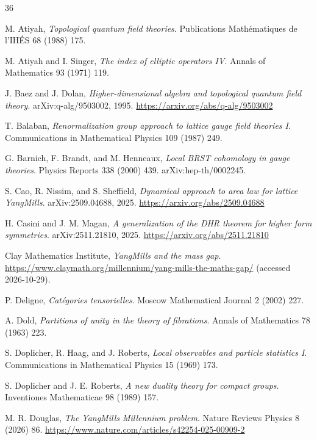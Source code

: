 \documentclass[11pt,letterpaper]{article}
\theoremstyle{definition}
\theoremstyle{remark}
\begin{document}
\begin{thebibliography}{36}

M. Atiyah, \emph{Topological quantum field theories}. Publications Math\'ematiques de l'IH\'ES 68 (1988) 175.

M. Atiyah and I. Singer, \emph{The index of elliptic operators IV}. Annals of Mathematics 93 (1971) 119.

J. Baez and J. Dolan, \emph{Higher-dimensional algebra and topological quantum field theory}. arXiv:q-alg/9503002, 1995. \url{https://arxiv.org/abs/q-alg/9503002}

T. Balaban, \emph{Renormalization group approach to lattice gauge field theories I}. Communications in Mathematical Physics 109 (1987) 249.

G. Barnich, F. Brandt, and M. Henneaux, \emph{Local BRST cohomology in gauge theories}. Physics Reports 338 (2000) 439. arXiv:hep-th/0002245.

S. Cao, R. Nissim, and S. Sheffield, \emph{Dynamical approach to area law for lattice Yang\textendash{}Mills}. arXiv:2509.04688, 2025. \url{https://arxiv.org/abs/2509.04688}

H. Casini and J. M. Magan, \emph{A generalization of the DHR theorem for higher form symmetries}. arXiv:2511.21810, 2025. \url{https://arxiv.org/abs/2511.21810}

Clay Mathematics Institute, \emph{Yang\textendash{}Mills and the mass gap}. \url{https://www.claymath.org/millennium/yang-mills-the-maths-gap/} (accessed 2026-10-29).

P. Deligne, \emph{Cat\'egories tensorielles}. Moscow Mathematical Journal 2 (2002) 227.

A. Dold, \emph{Partitions of unity in the theory of fibrations}. Annals of Mathematics 78 (1963) 223.

S. Doplicher, R. Haag, and J. Roberts, \emph{Local observables and particle statistics I}. Communications in Mathematical Physics 15 (1969) 173.

S. Doplicher and J. E. Roberts, \emph{A new duality theory for compact groups}. Inventiones Mathematicae 98 (1989) 157.

M. R. Douglas, \emph{The Yang\textendash{}Mills Millennium problem}. Nature Reviews Physics 8 (2026) 86. \url{https://www.nature.com/articles/s42254-025-00909-2}


\end{thebibliography}
\end{document}
